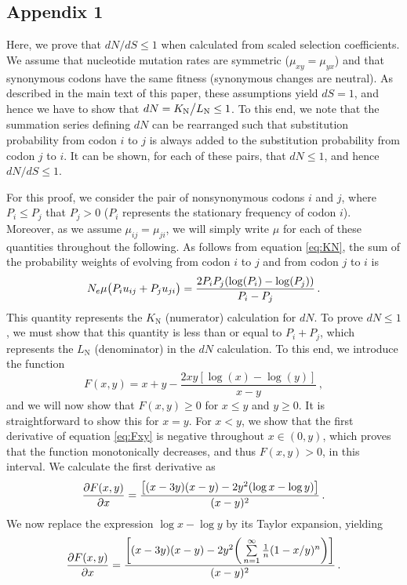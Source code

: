 \documentclass{pnastwo}
\begin{document}
\begin{article}
\section*{Appendix 1}
Here, we prove that $dN/dS \leq 1$ when calculated from scaled selection coefficients. We assume that nucleotide mutation rates are symmetric ($\mu_{xy} = \mu_{yx}$) and that synonymous codons have the same fitness (synonymous changes are neutral). As described in the main text of this paper, these assumptions yield $dS = 1$, and hence we have to show that $dN = K_\text{N}\big{/}L_\text{N} \leq 1$. To this end, we note that the summation series defining $dN$ can be rearranged such that substitution probability from codon $i$ to $j$ is always added to the substitution probability from codon $j$ to $i$. It can be shown, for each of these pairs, that $dN \leq 1$, and hence $dN/dS \leq 1$.

For this proof, we consider the pair of nonsynonymous codons $i$ and $j$, where $P_i \leq P_j$ that $P_j > 0$ ($P_i$ represents the stationary frequency of codon $i$). Moreover, as we assume $\mu_{ij} = \mu_{ji}$, we will simply write $\mu$ for each of these quantities throughout the following. As follows from equation \eqref{eq:KN}, the sum of the probability weights of evolving from codon $i$ to $j$ and from codon $j$ to $i$ is
\begin{equation}
N_e\mu \big{(} P_iu_{ij} + P_ju_{ji} \big{)} = \frac{2P_iP_j(\log(P_i) - \log(P_j))}{P_i - P_j} \,.
\end{equation}
This quantity represents the $K_\text{N}$ (numerator) calculation for $dN$. To prove $dN \leq 1$, we must show that this quantity is less than or equal to $P_i + P_j$, which represents the $L_\text{N}$ (denominator) in the $dN$ calculation. To this end, we introduce the function 
\begin{equation}\label{eq:Fxy}
F(x,y) = x + y - \frac{2xy[\log(x) - \log(y)]}{x - y} \,,
\end{equation}
and we will now show that $F(x,y) \geq 0$ for $x \leq y$ and $y \geq 0 $. It is straightforward to show this for $x=y$. For $x < y$, we show that the first derivative of equation \eqref{eq:Fxy} is negative throughout $x \in (0,y)$, which proves that the function monotonically decreases, and thus $F(x,y) > 0$, in this interval. We calculate the first derivative as 
\begin{equation}
\frac{\partial{F(x,y)}}{\partial{x}} = \frac{\big{[} (x-3y)(x-y) - 2y^2(\log{x} - \log{y}) \big{]}}{(x-y)^2} \,.
\end{equation}
We now replace the expression $\log{x} - \log{y}$ by its Taylor expansion, yielding
\begin{equation}\label{eq:expand}
	\frac{\partial{F(x,y)}}{\partial{x}} = 
	\frac{ \bigg{[} (x-3y)(x-y) - 2y^2\bigg{(}\sum\limits_{n=1}^\infty \frac{1}{n} (1-x/y)^n\bigg{)} \bigg{]}}{(x-y)^2} \,.
\end{equation}


\end{article}
\end{document}
